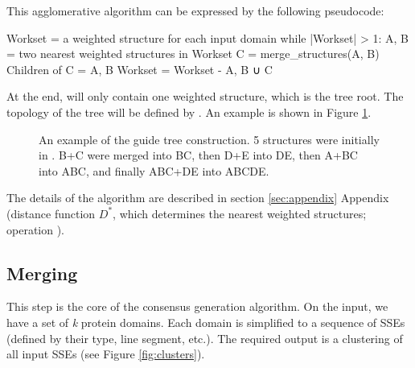 \documentclass{article}
\begin{document}
This agglomerative algorithm can be expressed by the following
pseudocode:

\begin{codeblock}
    Workset = { a weighted structure for each input domain }  
    while |Workset| > 1:  
        A, B = two nearest weighted structures in Workset
        C = merge_structures(A, B)  
        Children of C = {A, B}
        Workset = Workset - {A, B} ∪ {C}
\end{codeblock}

At the end,  will only contain one weighted structure,
which is the tree root. The topology of the tree will be defined by
. An example is shown in Figure \ref{fig:guide_tree}.

\begin{figure}[h!]
  \caption{An example of the guide tree construction. 5 structures were initially in .
  B+C were merged into BC, then D+E into DE, then A+BC into ABC, and finally ABC+DE into ABCDE.}
  \label{fig:guide_tree}
\end{figure}

The details of the algorithm are described in section \ref{sec:appendix} Appendix (distance function
\(D^{*}\), which determines the nearest weighted structures; operation
).



\subsection{Merging}
\label{sec:merging}

This step is the core of the consensus generation algorithm. On the input, we
have a set of \emph{k} protein domains. Each domain is simplified to a
sequence of SSEs (defined by their type, line segment, etc.). 
The required output is a clustering of all input SSEs (see Figure \ref{fig:clusters}).
\end{document}
